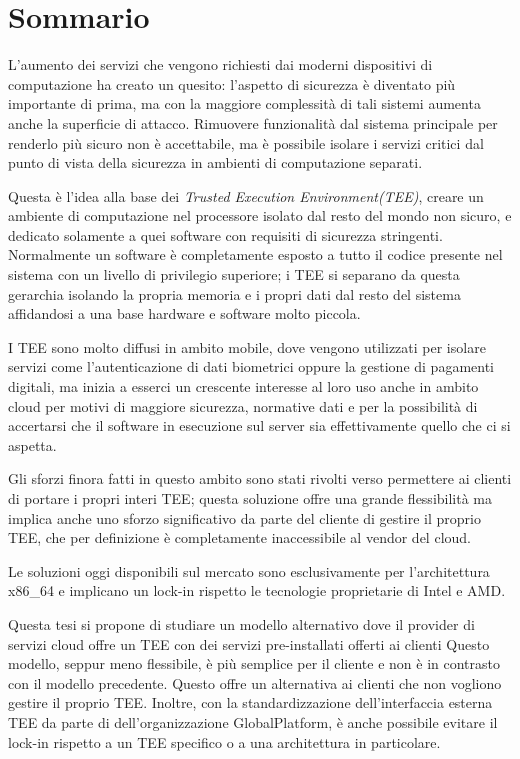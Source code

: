 \documentclass[12pt,italian]{report}
\begin{document}
\frontespizio
\afterpreface

\chapter*{Sommario}
\label{cap:sommario}
L'aumento dei servizi che vengono richiesti dai moderni dispositivi di
computazione ha creato un quesito: l'aspetto di sicurezza è diventato più
importante di prima, ma con la maggiore complessità di tali sistemi aumenta
anche la superficie di attacco.
Rimuovere funzionalità dal sistema principale per renderlo più sicuro non
è accettabile, ma è possibile isolare i servizi critici dal punto di vista
della sicurezza in ambienti di computazione separati.

Questa è l'idea alla base dei \textit{Trusted Execution Environment(TEE)},
creare un ambiente di computazione nel processore isolato dal resto del
mondo non sicuro\cite{sabt2015tee}, e dedicato solamente a quei software
con requisiti di sicurezza stringenti.
Normalmente un software è completamente esposto a tutto il codice
presente nel sistema con un livello di privilegio superiore;
i TEE si separano da questa gerarchia isolando la propria memoria e i propri
dati dal resto del sistema affidandosi a una base hardware e software
molto piccola.

I TEE sono molto diffusi in ambito mobile, dove vengono utilizzati per
isolare servizi come l'autenticazione di dati biometrici\cite{androidbiometrics}
oppure la gestione di pagamenti digitali\cite{secure_payments}, ma inizia a esserci
un crescente interesse al loro
uso anche in ambito cloud\cite{confidential_computing_consortium} per
motivi di maggiore sicurezza,
normative dati e  per la possibilità di accertarsi che il software
in esecuzione sul server sia effettivamente quello che ci si aspetta.

Gli sforzi finora fatti in questo ambito sono stati rivolti verso permettere
ai clienti di portare i propri interi TEE; questa soluzione offre una grande
flessibilità ma implica anche uno sforzo significativo da parte del cliente
di gestire il proprio TEE, che per definizione è completamente inaccessibile
al vendor del cloud.

Le soluzioni oggi disponibili sul mercato sono esclusivamente per
l'architettura x86\_64 e implicano un lock-in rispetto le tecnologie
proprietarie di Intel e AMD.

Questa tesi si propone di studiare un modello alternativo dove il provider
di servizi cloud offre un TEE con dei servizi pre-installati offerti ai
clienti
Questo modello, seppur meno flessibile, è più semplice per il cliente e non
è in contrasto con il modello precedente. Questo offre un alternativa
ai clienti che non vogliono gestire il proprio TEE.
Inoltre, con la standardizzazione dell'interfaccia esterna TEE da parte di
dell'organizzazione GlobalPlatform\cite{gp2020clientapi}, è anche possibile
evitare il lock-in rispetto a un TEE specifico o a una
architettura in particolare.
\end{document}
